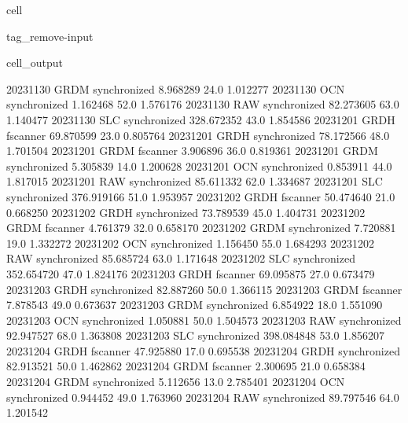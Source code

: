 \documentclass[letterpaper,10pt,english]{jupyterBook}
\begin{document}
\begin{sphinxuseclass}{cell}
\begin{sphinxuseclass}{tag_remove-input}
\begin{sphinxVerbatimOutput}
\begin{sphinxuseclass}{cell_output}
\begin{sphinxVerbatim}[commandchars=\\\{\}]
2023\PYGZhy{}11\PYGZhy{}30         GRDM  synchronized    8.968289    24.0    1.012277
2023\PYGZhy{}11\PYGZhy{}30          OCN  synchronized    1.162468    52.0    1.576176
2023\PYGZhy{}11\PYGZhy{}30          RAW  synchronized   82.273605    63.0    1.140477
2023\PYGZhy{}11\PYGZhy{}30          SLC  synchronized  328.672352    43.0    1.854586
2023\PYGZhy{}12\PYGZhy{}01         GRDH      fscanner   69.870599    23.0    0.805764
2023\PYGZhy{}12\PYGZhy{}01         GRDH  synchronized   78.172566    48.0    1.701504
2023\PYGZhy{}12\PYGZhy{}01         GRDM      fscanner    3.906896    36.0    0.819361
2023\PYGZhy{}12\PYGZhy{}01         GRDM  synchronized    5.305839    14.0    1.200628
2023\PYGZhy{}12\PYGZhy{}01          OCN  synchronized    0.853911    44.0    1.817015
2023\PYGZhy{}12\PYGZhy{}01          RAW  synchronized   85.611332    62.0    1.334687
2023\PYGZhy{}12\PYGZhy{}01          SLC  synchronized  376.919166    51.0    1.953957
2023\PYGZhy{}12\PYGZhy{}02         GRDH      fscanner   50.474640    21.0    0.668250
2023\PYGZhy{}12\PYGZhy{}02         GRDH  synchronized   73.789539    45.0    1.404731
2023\PYGZhy{}12\PYGZhy{}02         GRDM      fscanner    4.761379    32.0    0.658170
2023\PYGZhy{}12\PYGZhy{}02         GRDM  synchronized    7.720881    19.0    1.332272
2023\PYGZhy{}12\PYGZhy{}02          OCN  synchronized    1.156450    55.0    1.684293
2023\PYGZhy{}12\PYGZhy{}02          RAW  synchronized   85.685724    63.0    1.171648
2023\PYGZhy{}12\PYGZhy{}02          SLC  synchronized  352.654720    47.0    1.824176
2023\PYGZhy{}12\PYGZhy{}03         GRDH      fscanner   69.095875    27.0    0.673479
2023\PYGZhy{}12\PYGZhy{}03         GRDH  synchronized   82.887260    50.0    1.366115
2023\PYGZhy{}12\PYGZhy{}03         GRDM      fscanner    7.878543    49.0    0.673637
2023\PYGZhy{}12\PYGZhy{}03         GRDM  synchronized    6.854922    18.0    1.551090
2023\PYGZhy{}12\PYGZhy{}03          OCN  synchronized    1.050881    50.0    1.504573
2023\PYGZhy{}12\PYGZhy{}03          RAW  synchronized   92.947527    68.0    1.363808
2023\PYGZhy{}12\PYGZhy{}03          SLC  synchronized  398.084848    53.0    1.856207
2023\PYGZhy{}12\PYGZhy{}04         GRDH      fscanner   47.925880    17.0    0.695538
2023\PYGZhy{}12\PYGZhy{}04         GRDH  synchronized   82.913521    50.0    1.462862
2023\PYGZhy{}12\PYGZhy{}04         GRDM      fscanner    2.300695    21.0    0.658384
2023\PYGZhy{}12\PYGZhy{}04         GRDM  synchronized    5.112656    13.0    2.785401
2023\PYGZhy{}12\PYGZhy{}04          OCN  synchronized    0.944452    49.0    1.763960
2023\PYGZhy{}12\PYGZhy{}04          RAW  synchronized   89.797546    64.0    1.201542

\end{sphinxVerbatim}
\end{sphinxuseclass}
\end{sphinxVerbatimOutput}
\end{sphinxuseclass}
\end{sphinxuseclass}
\end{document}
